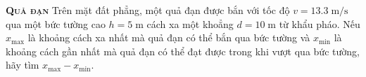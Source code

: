 

\begin{problem}
	{\textbf{\textsc{Quả đạn}}} Trên mặt đất phẳng, một quả đạn được bắn với tốc độ $v=13.3\;\mathrm{m/s}$ qua một bức tường cao $h=5\;\mathrm{m}$ cách xa một khoẳng $d=10\;\mathrm{m}$ từ khẩu pháo. Nếu $x_{\max}$ là khoảng cách xa nhất mà quả đạn có thể bắn qua bức tường và $x_{\min}$ là khoảng cách gần nhất mà quả đạn có thể đạt được trong khi vượt qua bức tường, hãy tìm $x_{\max}-x_{\min}$.
	
\end{problem}
